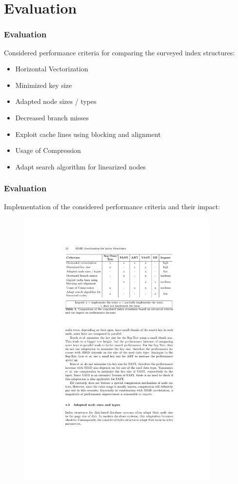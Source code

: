 \documentclass{beamer}
\begin{document}
\section{Evaluation}

\begin{frame}
	\frametitle{Evaluation}
	Considered performance criteria for comparing the surveyed index structures:
	\begin{itemize}
		\item Horizontal Vectorization
		\item Minimized key size
		\item Adapted node sizes / types
		\item Decreased branch misses
		\item Exploit cache lines using blocking and alignment
		\item Usage of Compression
		\item Adapt search algorithm for linearized nodes
	\end{itemize}
\end{frame}

\begin{frame}
\frametitle{Evaluation}
Implementation of the considered performance criteria and their impact:
\begin{figure}
	\includegraphics[width=0.9\textwidth]{img/table.pdf}
\end{figure}


\end{frame}
\end{document}
